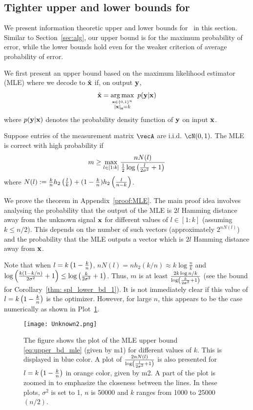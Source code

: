 \subsection{Tighter upper and lower bounds for \spl}\label{sec:tighter_bounds_spl}
We present information theoretic upper and lower bounds for \spl\ in this section. Similar to Section~\ref{sec:alg}, our upper bound is for the maximum probability of error, while the lower bounds hold even for the weaker criterion of average probability of error.

We first present an upper bound based on the maximum likelihood estimator (MLE) where  we  decode to $\hat{\mathbf{x}}$ if, on output $\mathbf{y}$, 
\begin{align*}
\hat{\mathbf{x}} = \operatorname*{arg\,max}_{\stackrel{\mathbf{x}\in \left\{0,1\right\}^n}{{\left|\mathbf{x}\right|}_{\mathsf{H}} = k}}\,\, p(\mathbf{y}|{\mathbf{x}})
\end{align*} where $p(\mathbf{y}|{\mathbf{x}})$ denotes the probability density function of $\mathbf{y}$ on input $\mathbf{x}$.
\begin{theorem}\label{thm:upper_bd_mle} Suppose  entries of the measurement matrix $\vecA$ are i.i.d. $\cN(0,1).$
The MLE  is correct with high probability if 
\begin{align}m\geq \max_{l\in[1:k]}  \frac{nN(l)}{\frac{1}{2}\log\left(\frac{ l}{2\sigma^2}+1\right)}\label{eq:upper_bd_mle}
\end{align}where  $N(l):=  \frac{k}{n} h_2\left(\frac{l}{k}\right) + (1-\frac{k}{n})h_2\left(\frac{l}{n-k}\right)$. 
\end{theorem}
We prove the theorem in Appendix~\ref{proof:MLE}. The main proof idea involves analysing the probability that the output of the MLE is $2l$ Hamming distance away from the unknown signal $\mathbf{x}$ for different values of $l\in [1:k]$ (assuming $k\leq n/2$). This depends on the number of such vectors (approximately $2^{nN(l)}$) and the probability that the MLE outputs a vector which is $2l$ Hamming distance away from $\mathbf{x}$. 

Note that when $l = k\left(1-\frac{k}{n}\right)$, $nN(l) = nh_2(k/n)\approx k\log{\frac{n}{k}}$ and $\log\left(\frac{k\left(1-k/n\right)}{2\sigma^2}+1\right)\leq \log\left(\frac{k}{2\sigma^2}+1\right)$.
Thus, $m$ is at least $\frac{2k\log{n/k}}{\log\left(\frac{k}{2\sigma^2}+1\right)}$ (see the bound for Corollary~\ref{thm: spl_lower_bd_1}). It is not immediately clear if this value of $l= k\left(1-\frac{k}{n}\right)$ is the optimizer. However, for large $n$, this appears to be the case numerically as shown in Plot~\ref{plot:1}.

\begin{figure}[t]
\texttt{[image: Unknown2.png]}
\centering
\caption{The figure shows the plot of the MLE upper bound \eqref{eq:upper_bd_mle} (given by m1) for different values of $k$. This is displayed in blue color. A plot of $\frac{2nN(l)}{\log\left(\frac{ l}{2\sigma^2}+1\right)}$ is also presented for $l = k\left(1-\frac{k}{n}\right)$ in orange color, given by m2. A part of the plot is zoomed in to emphasize the closeness between the lines. In these plots,  $\sigma^2$ is set to 1,  $n$ is 50000 and $k$ ranges from 1000 to 25000 $(n/2)$. }\label{plot:1}
\end{figure}


